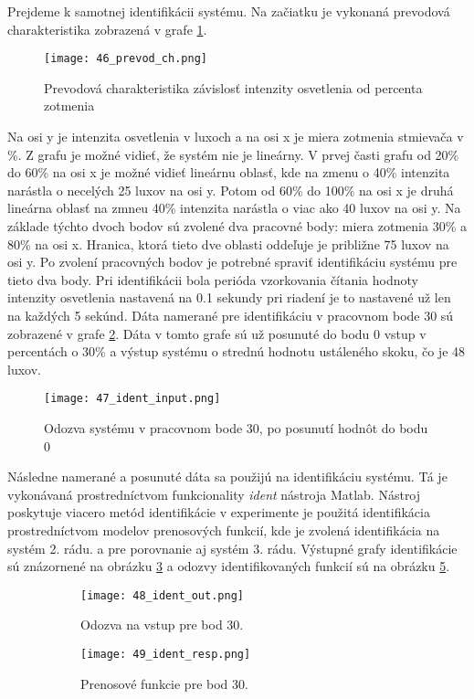 \indent Prejdeme k samotnej identifikácii systému. Na začiatku je vykonaná prevodová charakteristika zobrazená v grafe \ref{46_prevod_ch}. 
\begin{figure}[!htbp]
\centering
\texttt{[image: 46\_prevod\_ch.png]}
\caption{Prevodová charakteristika závislosť intenzity osvetlenia od percenta zotmenia}
\label{46_prevod_ch}
\end{figure}
Na osi y je intenzita osvetlenia v luxoch a na osi x je miera zotmenia stmievača v \%. Z grafu je možné vidieť, že systém nie je lineárny. V prvej časti grafu od 20\% do 60\% na osi x je možné vidieť lineárnu oblasť, kde na zmenu o 40\% intenzita narástla o necelých 25 luxov na osi y. Potom  od 60\% do 100\% na osi x je druhá lineárna oblasť na zmneu 40\% intenzita narástla o viac ako 40 luxov na osi y. Na základe týchto dvoch bodov sú zvolené dva pracovné body: miera zotmenia 30\% a 80\% na osi x. Hranica, ktorá tieto dve oblasti oddeľuje je približne 75 luxov na osi y. Po zvolení pracovných bodov je potrebné spraviť identifikáciu systému pre tieto dva body. Pri identifikácii bola perióda vzorkovania čítania hodnoty intenzity osvetlenia nastavená na 0.1 sekundy pri riadení je to nastavené už len na každých 5 sekúnd. Dáta namerané pre identifikáciu v pracovnom bode 30 sú zobrazené v grafe \ref{47_ident_input}. Dáta v tomto grafe sú už posunuté do bodu 0 vstup v percentách o 30\% a výstup systému o strednú hodnotu ustáleného skoku, čo je 48 luxov. 
\begin{figure}[!htbp]
\centering
\texttt{[image: 47\_ident\_input.png]}
\caption{Odozva systému v pracovnom bode 30, po posunutí hodnôt do bodu 0}
\label{47_ident_input}
\end{figure}
Následne namerané a posunuté dáta sa použijú na identifikáciu systému. Tá je vykonávaná prostredníctvom funkcionality \textit{ident} nástroja Matlab. Nástroj poskytuje viacero metód identifikácie v experimente je použitá identifikácia prostredníctvom modelov prenosových funkcií, kde je zvolená identifikácia na systém 2. rádu. a pre porovnanie aj systém 3. rádu. Výstupné grafy identifikácie  sú znázornené na obrázku \ref{48_ident_out} a odozvy identifikovaných funkcií sú na obrázku \ref{49_ident_resp}.

\begin{figure}[!htbp]
\centering
\begin{subfigure}{0.5\linewidth}
\texttt{[image: 48\_ident\_out.png]}
\caption{Odozva na vstup pre bod 30.}
\label{48_ident_out}
\end{subfigure}%
\begin{subfigure}{0.5\linewidth}
\texttt{[image: 49\_ident\_resp.png]}
\caption{Prenosové funkcie pre bod 30.}
\label{49_ident_resp}
\end{subfigure}
\caption{}
\end{figure}

